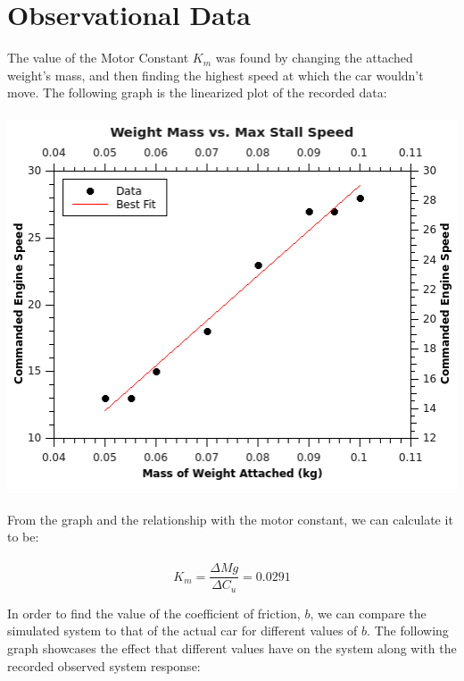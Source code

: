 \documentclass{article}
\begin{document}
\section*{Observational Data}
{
The value of the Motor Constant $K_m$ was found by changing the attached weight's mass, and then finding the highest speed at which the car wouldn't move. The following graph is the linearized plot of the recorded data:
\\
\\
\includegraphics[width=14cm]{MotorConstantGraph.png}
\\
\\
From the graph and the relationship with the motor constant, we can calculate it to be:
\\
\\
\[ K_m = \frac{\Delta M g}{\Delta C_u} = 0.0291 \]

\pagebreak

In order to find the value of the coefficient of friction, $b$, we can compare the simulated system to that of the actual car for different values of $b$. The following graph showcases the effect that different values have on the system along with the recorded observed system response:
\\
\\
}
\end{document}
